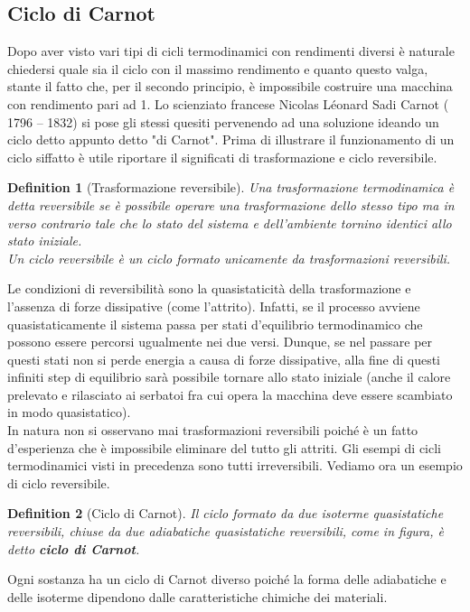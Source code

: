 \documentclass[10pt,a4paper]{article}
\newtheorem{definition}{Definition}
\begin{document}
\subsection{Ciclo di Carnot}
Dopo aver visto vari tipi di cicli termodinamici con rendimenti diversi è naturale chiedersi quale sia il ciclo con il massimo rendimento e quanto questo valga, stante il fatto che, per il secondo principio, è impossibile costruire una macchina con rendimento pari ad 1. Lo scienziato francese Nicolas Léonard Sadi Carnot ( 1796 – 1832) si pose gli stessi quesiti pervenendo ad una soluzione ideando un ciclo detto appunto detto "di Carnot". Prima di illustrare il funzionamento di un ciclo siffatto è utile riportare il significati di trasformazione e ciclo reversibile.
\begin{definition}[Trasformazione reversibile]
	Una trasformazione termodinamica è detta reversibile se è possibile operare una trasformazione dello stesso tipo ma in verso contrario tale che lo stato del sistema e dell'ambiente tornino identici allo stato iniziale. \\
	Un ciclo reversibile è un ciclo formato unicamente da trasformazioni reversibili.
\end{definition}
Le condizioni di reversibilità sono la quasistaticità della trasformazione e l'assenza di forze dissipative (come l'attrito). Infatti, se il processo avviene quasistaticamente il sistema passa per stati d'equilibrio termodinamico che possono essere percorsi ugualmente nei due versi. Dunque, se nel passare per questi stati non si perde energia a causa di forze dissipative, alla fine di questi infiniti step di equilibrio sarà possibile tornare allo stato iniziale (anche il calore prelevato e rilasciato ai serbatoi fra cui opera la macchina deve essere scambiato in modo quasistatico).\\
In natura non si osservano mai trasformazioni reversibili poiché è un fatto d'esperienza che è impossibile eliminare del tutto gli attriti.  Gli esempi di cicli termodinamici visti in precedenza sono tutti irreversibili. Vediamo ora un esempio di ciclo reversibile.
\begin{definition}[Ciclo di Carnot]
	Il ciclo formato da due isoterme quasistatiche reversibili, chiuse da due adiabatiche quasistatiche reversibili, come in figura, è detto \textbf{ciclo di Carnot}.
\end{definition} 
 Ogni sostanza ha un ciclo di Carnot diverso poiché la forma delle adiabatiche e delle isoterme dipendono dalle caratteristiche chimiche dei materiali. 
\end{document}
